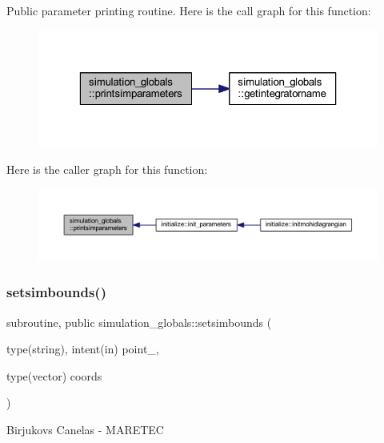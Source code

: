 Public parameter printing routine. Here is the call graph for this function\+:
\nopagebreak
\begin{figure}[H]
\begin{center}
\leavevmode
\includegraphics[width=323pt]{namespacesimulation__globals_a1e5d10f7d7954c9d5346294c72a738c1_cgraph}
\end{center}
\end{figure}
Here is the caller graph for this function\+:
\nopagebreak
\begin{figure}[H]
\begin{center}
\leavevmode
\includegraphics[width=350pt]{namespacesimulation__globals_a1e5d10f7d7954c9d5346294c72a738c1_icgraph}
\end{center}
\end{figure}
\mbox{\label{namespacesimulation__globals_a8e4aaa3352a4aa807b5cdf0a537c13e8}} 
\subsubsection{\texorpdfstring{setsimbounds()}{setsimbounds()}}
{\footnotesize\ttfamily subroutine, public simulation\+\_\+globals\+::setsimbounds (\begin{DoxyParamCaption}\item[{type(string), intent(in)}]{point\+\_\+,  }\item[{type(vector)}]{coords }\end{DoxyParamCaption})}



Birjukovs Canelas -\/ M\+A\+R\+E\+T\+EC 

